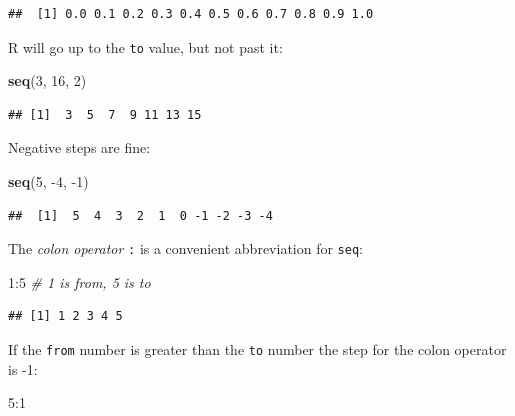 \documentclass[]{book}
\makeatletter
\newenvironment{Shaded}{\begin{snugshade}}{\end{snugshade}}
\newcommand{\KeywordTok}[1]{\textcolor[rgb]{0.13,0.29,0.53}{\textbf{{#1}}}}
\newcommand{\DecValTok}[1]{\textcolor[rgb]{0.00,0.00,0.81}{{#1}}}
\newcommand{\CommentTok}[1]{\textcolor[rgb]{0.56,0.35,0.01}{\textit{{#1}}}}
\newcommand{\NormalTok}[1]{{#1}}
\newenvironment{kframe}{%
\medskip{}
\setlength{\fboxsep}{.8em}
 \def\at@end@of@kframe{}%
 \ifinner\ifhmode%
  \def\at@end@of@kframe{\end{minipage}}%
  \begin{minipage}{\columnwidth}%
 \fi\fi%
 \def\FrameCommand##1{\hskip\@totalleftmargin \hskip-\fboxsep
 \colorbox{shadecolor}{##1}\hskip-\fboxsep
     \hskip-\linewidth \hskip-\@totalleftmargin \hskip\columnwidth}%
 \MakeFramed {\advance\hsize-\width
   \@totalleftmargin\z@ \linewidth\hsize
   \@setminipage}}%
 {\par\unskip\endMakeFramed%
 \at@end@of@kframe}
\renewenvironment{Shaded}{\begin{kframe}}{\end{kframe}}
\theoremstyle{definition}
\theoremstyle{definition}
\theoremstyle{remark}
\makeatother
\begin{document}
\begin{verbatim}
##  [1] 0.0 0.1 0.2 0.3 0.4 0.5 0.6 0.7 0.8 0.9 1.0
\end{verbatim}

R will go up to the \texttt{to} value, but not past it:

\begin{Shaded}
\begin{Highlighting}[]
\KeywordTok{seq}\NormalTok{(}\DecValTok{3}\NormalTok{, }\DecValTok{16}\NormalTok{, }\DecValTok{2}\NormalTok{)}
\end{Highlighting}
\end{Shaded}

\begin{verbatim}
## [1]  3  5  7  9 11 13 15
\end{verbatim}

Negative steps are fine:

\begin{Shaded}
\begin{Highlighting}[]
\KeywordTok{seq}\NormalTok{(}\DecValTok{5}\NormalTok{, -}\DecValTok{4}\NormalTok{, -}\DecValTok{1}\NormalTok{)}
\end{Highlighting}
\end{Shaded}

\begin{verbatim}
##  [1]  5  4  3  2  1  0 -1 -2 -3 -4
\end{verbatim}

The \emph{colon operator} \texttt{:} is a convenient abbreviation for
\texttt{seq}:

\begin{Shaded}
\begin{Highlighting}[]
\DecValTok{1}\NormalTok{:}\DecValTok{5} \CommentTok{# 1 is from, 5 is to}
\end{Highlighting}
\end{Shaded}

\begin{verbatim}
## [1] 1 2 3 4 5
\end{verbatim}

If the \texttt{from} number is greater than the \texttt{to} number the
step for the colon operator is -1:

\begin{Shaded}
\begin{Highlighting}[]
\DecValTok{5}\NormalTok{:}\DecValTok{1}
\end{Highlighting}
\end{Shaded}
\end{document}
